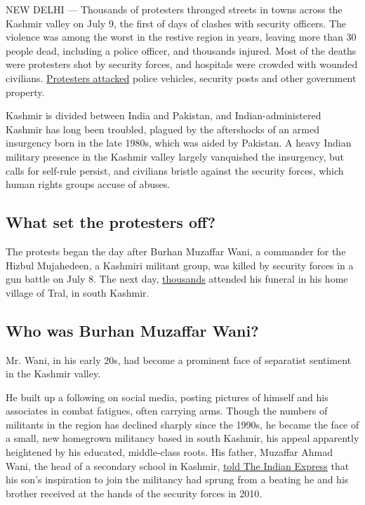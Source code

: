 NEW DELHI --- Thousands of protesters thronged streets in towns across
the Kashmir valley on July 9, the first of days of clashes with security
officers. The violence was among the worst in the restive region in
years, leaving more than 30 people dead, including a police officer, and
thousands injured. Most of the deaths were protesters shot by security
forces, and hospitals were crowded with wounded civilians.
\href{http://www.nytimes.com/2016/07/11/world/asia/death-toll-kashmir-protests.html?_r=0}{Protesters
attacked} police vehicles, security posts and other government property.

Kashmir is divided between India and Pakistan, and Indian-administered
Kashmir has long been troubled, plagued by the aftershocks of an armed
insurgency born in the late 1980s, which was aided by Pakistan. A heavy
Indian military presence in the Kashmir valley largely vanquished the
insurgency, but calls for self-rule persist, and civilians bristle
against the security forces, which human rights groups accuse of abuses.

\hypertarget{what-set-the-protesters-off}{%
\subsection{What set the protesters
off?}\label{what-set-the-protesters-off}}

The protests began the day after Burhan Muzaffar Wani, a commander for
the Hizbul Mujahedeen, a Kashmiri militant group, was killed by security
forces in a gun battle on July 8. The next day,
\href{http://timesofindia.indiatimes.com/india/Violence-erupts-in-Kashmir-after-death-of-Hizbul-Mujahideen-terrorist-Burhan-Wani-3-killed/articleshow/53130289.cms}{thousands}
attended his funeral in his home village of Tral, in south Kashmir.

\hypertarget{who-was-burhan-muzaffar-wani}{%
\subsection{Who was Burhan Muzaffar
Wani?}\label{who-was-burhan-muzaffar-wani}}

Mr. Wani, in his early 20s, had become a prominent face of separatist
sentiment in the Kashmir valley.

He built up a following on social media, posting pictures of himself and
his associates in combat fatigues, often carrying arms. Though the
numbers of militants in the region has declined sharply since the 1990s,
he became the face of a small, new homegrown militancy based in south
Kashmir, his appeal apparently heightened by his educated, middle-class
roots. His father, Muzaffar Ahmad Wani, the head of a secondary school
in Kashmir,
\href{http://indianexpress.com/article/india/india-others/i-feared-seeing-burhan-dead-never-thought-it-would-be-my-other-son-tral-victims-father/}{told
The Indian Express} that his son's inspiration to join the militancy had
sprung from a beating he and his brother received at the hands of the
security forces in 2010.


